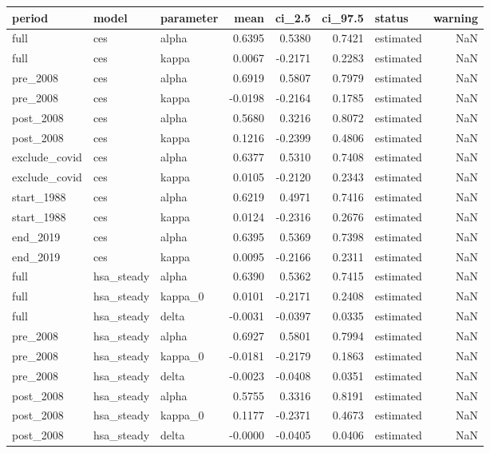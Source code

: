 \begin{tabular}{lllrrrlr}
\toprule
period & model & parameter & mean & ci\_2.5 & ci\_97.5 & status & warning \\
\midrule
full & ces & alpha & 0.6395 & 0.5380 & 0.7421 & estimated & NaN \\
full & ces & kappa & 0.0067 & -0.2171 & 0.2283 & estimated & NaN \\
pre\_2008 & ces & alpha & 0.6919 & 0.5807 & 0.7979 & estimated & NaN \\
pre\_2008 & ces & kappa & -0.0198 & -0.2164 & 0.1785 & estimated & NaN \\
post\_2008 & ces & alpha & 0.5680 & 0.3216 & 0.8072 & estimated & NaN \\
post\_2008 & ces & kappa & 0.1216 & -0.2399 & 0.4806 & estimated & NaN \\
exclude\_covid & ces & alpha & 0.6377 & 0.5310 & 0.7408 & estimated & NaN \\
exclude\_covid & ces & kappa & 0.0105 & -0.2120 & 0.2343 & estimated & NaN \\
start\_1988 & ces & alpha & 0.6219 & 0.4971 & 0.7416 & estimated & NaN \\
start\_1988 & ces & kappa & 0.0124 & -0.2316 & 0.2676 & estimated & NaN \\
end\_2019 & ces & alpha & 0.6395 & 0.5369 & 0.7398 & estimated & NaN \\
end\_2019 & ces & kappa & 0.0095 & -0.2166 & 0.2311 & estimated & NaN \\
full & hsa\_steady & alpha & 0.6390 & 0.5362 & 0.7415 & estimated & NaN \\
full & hsa\_steady & kappa\_0 & 0.0101 & -0.2171 & 0.2408 & estimated & NaN \\
full & hsa\_steady & delta & -0.0031 & -0.0397 & 0.0335 & estimated & NaN \\
pre\_2008 & hsa\_steady & alpha & 0.6927 & 0.5801 & 0.7994 & estimated & NaN \\
pre\_2008 & hsa\_steady & kappa\_0 & -0.0181 & -0.2179 & 0.1863 & estimated & NaN \\
pre\_2008 & hsa\_steady & delta & -0.0023 & -0.0408 & 0.0351 & estimated & NaN \\
post\_2008 & hsa\_steady & alpha & 0.5755 & 0.3316 & 0.8191 & estimated & NaN \\
post\_2008 & hsa\_steady & kappa\_0 & 0.1177 & -0.2371 & 0.4673 & estimated & NaN \\
post\_2008 & hsa\_steady & delta & -0.0000 & -0.0405 & 0.0406 & estimated & NaN \\

\end{tabular}
